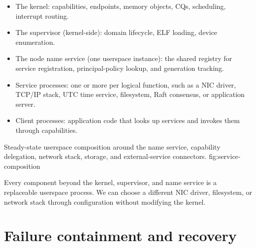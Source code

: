 \begin{itemize}
    \item The kernel: capabilities, endpoints, memory objects,
        CQs, scheduling, interrupt routing.
    \item The supervisor (kernel-side): domain lifecycle, ELF
        loading, device enumeration.
    \item  The node name service (one userspace instance): the
        shared registry for service registration, principal-policy lookup,
        and generation tracking.
    \item Service processes: one or more per logical function, such as a
        NIC driver, TCP/IP stack, UTC time service, filesystem, Raft consensus,
        or application server.
    \item Client processes: application code that looks up
        services and invokes them through capabilities.
\end{itemize}

    {Steady-state userspace composition around the name service, capability
    delegation, network stack, storage, and external-service connectors.}
    {fig:service-composition}

Every component beyond the kernel, supervisor, and name service is a replaceable
userspace process. We can choose a different NIC driver, filesystem, or network
stack through configuration without modifying the kernel.

\section{Failure containment and recovery}

